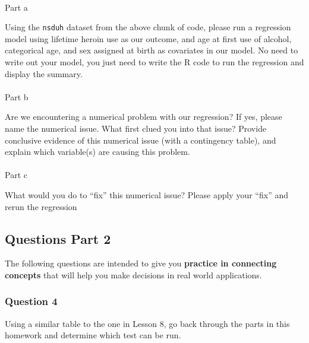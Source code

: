 \documentclass[
  letterpaper,
  DIV=11,
  numbers=noendperiod]{scrartcl}
\makeatletter
\let\oldparagraph\paragraph
\renewcommand{\paragraph}{
    \@ifstar
      \xxxParagraphStar
      \xxxParagraphNoStar
  }
\newcommand{\xxxParagraphStar}[1]{\oldparagraph*{#1}\mbox{}}
\newcommand{\xxxParagraphNoStar}[1]{\oldparagraph{#1}\mbox{}}
\makeatother
\begin{document}
\paragraph{Part a}\label{part-a-2}

Using the \texttt{nsduh} dataset from the above chunk of code, please
run a regression model using lifetime heroin use as our outcome, and age
at first use of alcohol, categorical age, and sex assigned at birth as
covariates in our model. No need to write out your model, you just need
to write the R code to run the regression and display the summary.

\paragraph{Part b}\label{part-b-2}

Are we encountering a numerical problem with our regression? If yes,
please name the numerical issue. What first clued you into that issue?
Provide conclusive evidence of this numerical issue (with a contingency
table), and explain which variable(s) are causing this problem.

\paragraph{Part c}\label{part-c-2}

What would you do to ``fix'' this numerical issue? Please apply your
``fix'' and rerun the regression

\subsection{Questions Part 2}\label{questions-part-2}

The following questions are intended to give you \textbf{practice in
connecting concepts} that will help you make decisions in real world
applications.

\subsubsection{Question 4}\label{question-4}

Using a similar table to the one in Lesson 8, go back through the parts
in this homework and determine which test can be run.
\end{document}

